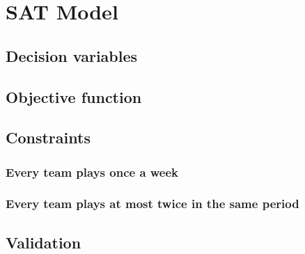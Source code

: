 \documentclass{article}
\begin{document}
\section{SAT Model}

\subsection{Decision variables}

\subsection{Objective function}

\subsection{Constraints}
\subsubsection{Every team plays once a week}
\subsubsection{Every team plays at most twice in the same period}

\subsection{Validation}
\end{document}
